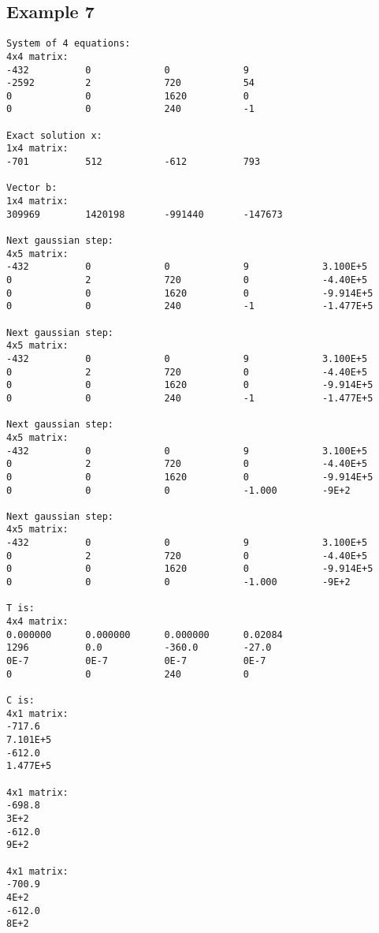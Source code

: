 \documentclass[letterpaper,12pt]{article}
\begin{document}
\subsection{Example 7}
\label{a:E7}
\begin{verbatim}
System of 4 equations:
4x4 matrix:
-432          0             0             9             
-2592         2             720           54            
0             0             1620          0             
0             0             240           -1            

Exact solution x:
1x4 matrix:
-701          512           -612          793           

Vector b:
1x4 matrix:
309969        1420198       -991440       -147673       

Next gaussian step:
4x5 matrix:
-432          0             0             9             3.100E+5      
0             2             720           0             -4.40E+5      
0             0             1620          0             -9.914E+5     
0             0             240           -1            -1.477E+5     

Next gaussian step:
4x5 matrix:
-432          0             0             9             3.100E+5      
0             2             720           0             -4.40E+5      
0             0             1620          0             -9.914E+5     
0             0             240           -1            -1.477E+5     

Next gaussian step:
4x5 matrix:
-432          0             0             9             3.100E+5      
0             2             720           0             -4.40E+5      
0             0             1620          0             -9.914E+5     
0             0             0             -1.000        -9E+2         

Next gaussian step:
4x5 matrix:
-432          0             0             9             3.100E+5      
0             2             720           0             -4.40E+5      
0             0             1620          0             -9.914E+5     
0             0             0             -1.000        -9E+2         

T is:
4x4 matrix:
0.000000      0.000000      0.000000      0.02084       
1296          0.0           -360.0        -27.0         
0E-7          0E-7          0E-7          0E-7          
0             0             240           0             

C is:
4x1 matrix:
-717.6        
7.101E+5      
-612.0        
1.477E+5      

4x1 matrix:
-698.8        
3E+2          
-612.0        
9E+2          

4x1 matrix:
-700.9        
4E+2          
-612.0        
8E+2
\end{verbatim}
\end{document}

